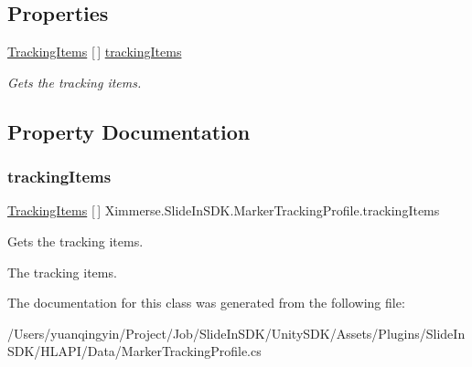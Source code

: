 \subsection*{Properties}
\begin{DoxyCompactItemize}
\item 
\mbox{\hyperlink{class_ximmerse_1_1_slide_in_s_d_k_1_1_marker_tracking_profile_1_1_tracking_items}{Tracking\+Items}} \mbox{[}$\,$\mbox{]} \mbox{\hyperlink{class_ximmerse_1_1_slide_in_s_d_k_1_1_marker_tracking_profile_a40ddcd3a56b296fc858256d543f597e2}{tracking\+Items}}
\begin{DoxyCompactList}\small\item\em Gets the tracking items. \end{DoxyCompactList}\end{DoxyCompactItemize}


\subsection{Property Documentation}
\mbox{\label{class_ximmerse_1_1_slide_in_s_d_k_1_1_marker_tracking_profile_a40ddcd3a56b296fc858256d543f597e2}} 
\subsubsection{\texorpdfstring{tracking\+Items}{trackingItems}}
{\footnotesize\ttfamily \mbox{\hyperlink{class_ximmerse_1_1_slide_in_s_d_k_1_1_marker_tracking_profile_1_1_tracking_items}{Tracking\+Items}} \mbox{[}$\,$\mbox{]} Ximmerse.\+Slide\+In\+S\+D\+K.\+Marker\+Tracking\+Profile.\+tracking\+Items\hspace{0.3cm}{\ttfamily [get]}}



Gets the tracking items. 

The tracking items.

The documentation for this class was generated from the following file\+:\begin{DoxyCompactItemize}
\item 
/\+Users/yuanqingyin/\+Project/\+Job/\+Slide\+In\+S\+D\+K/\+Unity\+S\+D\+K/\+Assets/\+Plugins/\+Slide\+In\+S\+D\+K/\+H\+L\+A\+P\+I/\+Data/Marker\+Tracking\+Profile.\+cs\end{DoxyCompactItemize}
